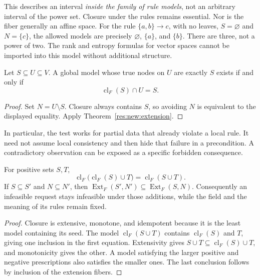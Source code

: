 This describes an interval \emph{inside the family of rule models}, not an arbitrary interval of the power set. Closure under the rules remains essential. Nor is the fiber generally an affine space. For the rule $\{a,b\}\to c$, with no leaves, $S=\varnothing$ and $N=\{c\}$, the allowed models are precisely $\varnothing$, $\{a\}$, and $\{b\}$. There are three, not a power of two. The rank and entropy formulas for vector spaces cannot be imported into this model without additional structure.

\begin{corollary}
\label{res:new:partial}
Let $S\subseteq U\subseteq V$. A global model whose true nodes on $U$ are exactly $S$ exists if and only if
\[
 \operatorname{cl}_F(S)\cap U=S.
\]
\end{corollary}
\begin{proof}
Set $N=U\setminus S$. Closure always contains $S$, so avoiding $N$ is equivalent to the displayed equality. Apply Theorem~\ref{res:new:extension}.
\end{proof}

In particular, the test works for partial data that already violate a local rule. It need not assume local consistency and then hide that failure in a precondition. A contradictory observation can be exposed as a specific forbidden consequence.

\begin{proposition}
\label{res:new:stages}
For positive sets $S,T$,
\[
 \operatorname{cl}_F\bigl(\operatorname{cl}_F(S)\cup T\bigr)
   =\operatorname{cl}_F(S\cup T).
\]
If $S\subseteq S'$ and $N\subseteq N'$, then
$\operatorname{Ext}_F(S',N')\subseteq\operatorname{Ext}_F(S,N)$.
Consequently an infeasible request stays infeasible under those additions, while the field and the meaning of its rules remain fixed.
\end{proposition}
\begin{proof}
Closure is extensive, monotone, and idempotent because it is the least model containing its seed. The model $\operatorname{cl}_F(S\cup T)$ contains $\operatorname{cl}_F(S)$ and $T$, giving one inclusion in the first equation. Extensivity gives $S\cup T\subseteq\operatorname{cl}_F(S)\cup T$, and monotonicity gives the other. A model satisfying the larger positive and negative prescriptions also satisfies the smaller ones. The last conclusion follows by inclusion of the extension fibers.
\end{proof}

